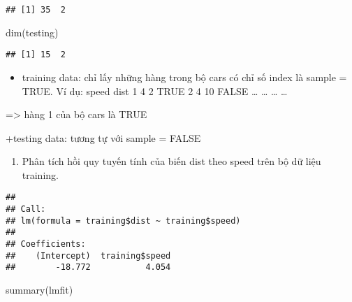\documentclass[
]{article}
\newenvironment{Shaded}{\begin{snugshade}}{\end{snugshade}}
\newcommand{\FunctionTok}[1]{\textcolor[rgb]{0.00,0.00,0.00}{#1}}
\newcommand{\NormalTok}[1]{#1}
\newcommand{\OtherTok}[1]{\textcolor[rgb]{0.56,0.35,0.01}{#1}}
\newcommand{\SpecialCharTok}[1]{\textcolor[rgb]{0.00,0.00,0.00}{#1}}
\providecommand{\tightlist}{%
  \setlength{\itemsep}{0pt}\setlength{\parskip}{0pt}}
\begin{document}
\begin{verbatim}
## [1] 35  2
\end{verbatim}

\begin{Shaded}
\begin{Highlighting}[]
\FunctionTok{dim}\NormalTok{(testing)}
\end{Highlighting}
\end{Shaded}

\begin{verbatim}
## [1] 15  2
\end{verbatim}

\begin{itemize}
\tightlist
\item
  training data: chỉ lấy những hàng trong bộ cars có chỉ số index là
  sample = TRUE. Ví dụ: speed dist 1 4 2 TRUE 2 4 10 FALSE \ldots{}
  \ldots{} \ldots{} \ldots{}
\end{itemize}

=\textgreater{} hàng 1 của bộ cars là TRUE

+testing data: tương tự với sample = FALSE

\begin{enumerate}
\def\labelenumi{\arabic{enumi}.}
\setcounter{enumi}{1}
\tightlist
\item
  Phân tích hồi quy tuyến tính của biến dist theo speed trên bộ dữ liệu
  training.
\end{enumerate}

\begin{Shaded}
\end{Shaded}

\begin{verbatim}
## 
## Call:
## lm(formula = training$dist ~ training$speed)
## 
## Coefficients:
##    (Intercept)  training$speed  
##        -18.772           4.054
\end{verbatim}

\begin{Shaded}
\begin{Highlighting}[]
\FunctionTok{summary}\NormalTok{(lmfit)}
\end{Highlighting}
\end{Shaded}
\end{document}
